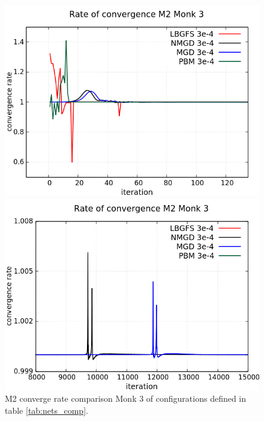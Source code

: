 \begin{figure}[H]
	\centering
	\begin{minipage}[t]{0.525\linewidth}		
		\includegraphics[width=\linewidth]{data/Comparison/Monk3/Monk3_M2_CR_zoomLeft.png}
	\end{minipage}%
	\begin{minipage}[t]{0.525\linewidth}
		\includegraphics[width=\linewidth]{data/Comparison/Monk3/Monk3_M2_CR_zoomRight.png}
	\end{minipage}
	\caption{M2 converge rate comparison Monk 3 of configurations defined in table \ref{tab:nets_comp}.}
	\label{fig:CR-M2-Monk3-Zoom}
\end{figure}


